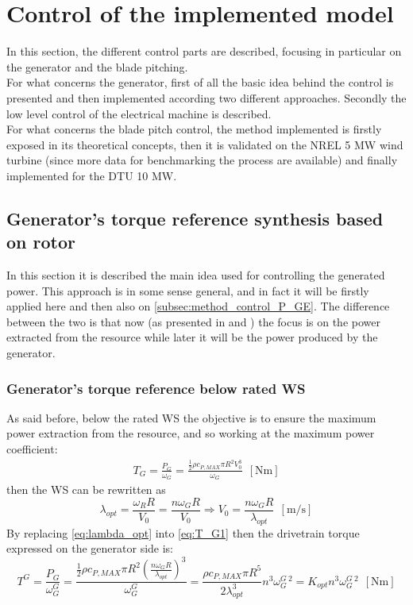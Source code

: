 \newpage
\section{Control of the implemented model}\label{sec:c_basic_model_control}
In this section, the different control parts are described, focusing in particular on the generator and the blade pitching. \\
For what concerns the generator, first of all the basic idea behind the control is presented and then implemented according two different approaches. Secondly the low level control of the electrical machine is described.\\
For what concerns the blade pitch control, the method implemented is firstly exposed in its theoretical concepts, then it is validated on the NREL 5 MW wind turbine (since more data for benchmarking the process are available) and finally implemented for the DTU 10 MW.   

\subsection{Generator's torque reference synthesis based on rotor}\label{subsec:torque_reference}
In this section it is described the main idea used for controlling the generated power. This approach is in some sense general, and in fact it will be firstly applied here and then also on \autoref{subsec:method_control_P_GE}. The difference between the two is that now (as presented in \cite{Aerodynamics_of_wind_turbines} and \cite{SMILDEN2016386}) the focus is on the power extracted from the resource while later it will be the power produced by the generator.

\subsubsection{Generator's torque reference below rated WS}\label{subsec:below_rotor}
As said before, below the rated WS the objective is to ensure the maximum power extraction from the resource, and so working at the maximum power coefficient:
\begin{gather}
    T_G=\frac{P_G}{\omega_G}=\frac{\frac{1}{2}\rho c_{P,MAX} \pi R^2 V_0^3}{\omega_G} \ \ \left[\si{\newton\meter}\right]
    \label{eq:T_G1}
\end{gather}
then the \acrshort{WS} can be rewritten as
\begin{equation}
    \lambda_{opt} = \frac{\omega_R R}{V_0} = \frac{n \omega_G R}{V_0} \Rightarrow V_0=\frac{n\omega_G R}{\lambda_{opt}}  \ \ \left[\si{\meter\per\second}\right]
    \label{eq:lambda_opt}
\end{equation}
By replacing \autoref{eq:lambda_opt} into \autoref{eq:T_G1} then the drivetrain torque expressed on the generator side is:
\begin{equation}
    T^G=\frac{P_G}{\omega_G^G}=\frac{\frac{1}{2}\rho c_{P,MAX} \pi R^2 \left(\frac{n\omega_G R}{\lambda_{opt}}\right)^3}{\omega_G^G} = \frac{\rho c_{P, MAX} \pi R^5 }{2 \lambda_{opt}^3}n^3\omega_G^{G \ 2} = K_{opt}n^3\omega_G^{G \ 2}  \ \ \left[\si{\newton\meter}\right]
    \label{eq:T_G2}
\end{equation}

